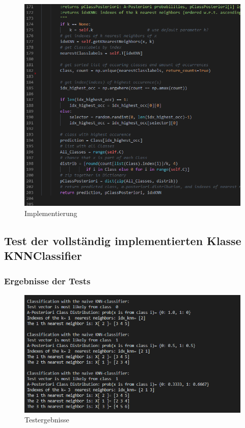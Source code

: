 \begin{figure}[H]
    \centering
    \includegraphics[width=1\linewidth]{files/aufgabe2b3.png}
    \caption{Implementierung}
\end{figure}

\subsection{Test der vollständig implementierten Klasse KNNClassifier}

\subsubsection{Ergebnisse der Tests}

\begin{figure}[H]
    \centering
    \includegraphics[width=1\linewidth]{files/aufgabe2c.png}
    \caption{Testergebnisse}
\end{figure}

